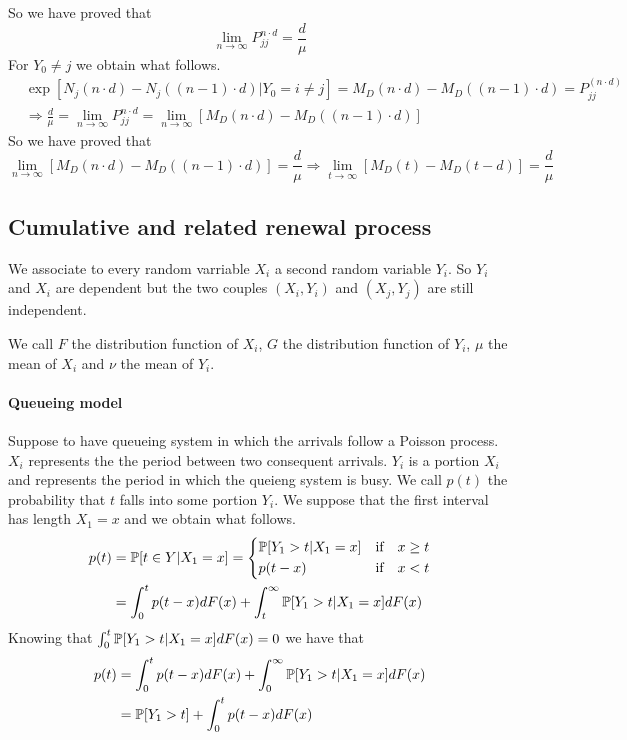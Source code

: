 	So we have proved that
	\begin{equation}
		\lim_{n \to \infty} P_{jj}^{n \cdot d}=\frac{d}{\mu}
	\end{equation}
	For $Y_0 \neq j$ we obtain what follows.
	\begin{align*}
		& \exp[N_j(n \cdot d)-N_j((n-1) \cdot d)|Y_0=i \neq j]=M_D(n \cdot d)-M_D((n-1) \cdot d)=P_{jj}^{(n \cdot d)}
		\\ & \Rightarrow \frac{d}{\mu}=\lim_{n \to \infty} P_{jj}^{n \cdot d} = \lim_{n \to \infty} [M_D(n \cdot d)-M_D((n-1) \cdot d)]
	\end{align*}
	So we have proved that
	\begin{equation}
		\lim_{n \to \infty} [M_D(n \cdot d)-M_D((n-1) \cdot d)]=\frac{d}{\mu} \Rightarrow \lim_{t \to \infty }[M_D(t)-M_D(t-d)]=\frac{d}{\mu}
	\end{equation}

\subsection{Cumulative and related renewal process}
	We associate to every random varriable $X_i$ a second random variable $Y_i$. So $Y_i$ and $X_i$ are dependent but the two couples $(X_i,Y_i)$ and $(X_j,Y_j)$ are still independent.

	We call $F$ the distribution function of $X_i$, $G$ the distribution function of $Y_i$, $\mu$ the mean of $X_i$ and $\nu$ the mean of $Y_i$.

	\paragraph{Queueing model}
	Suppose to have queueing system in which the arrivals follow a Poisson process. $X_i$ represents the the period between two consequent arrivals. $Y_i$ is a portion $X_i$ and represents the period in which the queieng system is busy. We call $p(t)$ the probability that $t$ falls into some portion $Y_i$. We suppose that the first interval has length $X_1=x$ and we obtain what follows.
	\begin{align*}
		p(t) & =\mathbb{P}[t \in Y |X_1 = x]=\begin{dcases}
			\mathbb{P}[Y_1>t|X_1=x] & \text{if} \quad x \geq t
			\\ p(t-x) & \text{if} \quad x<t
		\end{dcases}
		\\ & = \int_0^t p(t-x)dF(x)+\int_t^{\infty}\mathbb{P}[Y_1>t|X_1=x]dF(x)
	\end{align*}
	Knowing that $\int_0^{t}\mathbb{P}[Y_1>t|X_1=x]dF(x)=0$ we have that
	\begin{align*}
		p(t) & = \int_0^t p(t-x)dF(x)+\int_0^{\infty}\mathbb{P}[Y_1>t|X_1=x]dF(x)
		\\ & = \mathbb{P}[Y_1>t]+\int_0^t p(t-x)dF(x)
	\end{align*}

